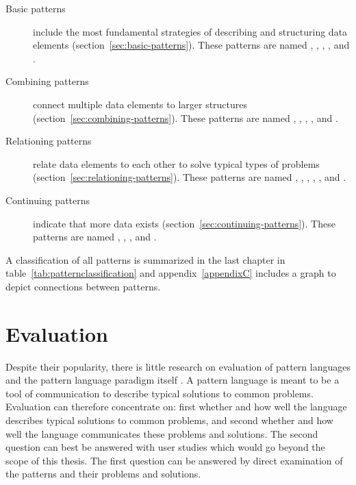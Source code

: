\begin{description}
\item[Basic patterns] include the most fundamental strategies of
	describing and structuring data elements (section~\ref{sec:basic-patterns}).
	These patterns are named , , 
	, , and .

\item[Combining patterns] connect multiple data elements to larger structures
	(section~\ref{sec:combining-patterns}). These patterns are named 
	, , , 
	, and .

\item[Relationing patterns] relate data elements to each other to solve
	typical types of problems
	(section~\ref{sec:relationing-patterns}). These patterns are named
	, , , ,
	, and .

\item[Continuing patterns] indicate that more data exists
	(section~\ref{sec:continuing-patterns}). These patterns are named
	, , , and .
\end{description}

\noindent A classification of all patterns is summarized in the last chapter in
table~\ref{tab:patternclassification} and appendix~\ref{appendixC} includes a
graph to depict connections between patterns.





\section{Evaluation}
\label{sec:evaluation}

Despite their popularity, there is little research on evaluation of pattern
languages and the pattern language paradigm itself
\cite{Petter2010,Dearden2006}.  A pattern language is meant to be a tool of
communication to describe typical solutions to common problems.  Evaluation can
therefore concentrate on: first whether and how well the language describes
typical solutions to common problems, and second whether and how well the
language communicates these problems and solutions. The second question can
best be answered with user studies which would go beyond the scope of this
thesis. The first question can be answered by direct examination of the
patterns and their problems and solutions.

